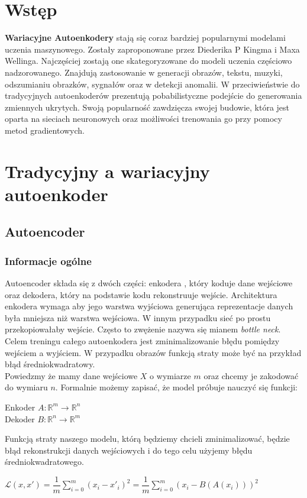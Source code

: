 \documentclass[a4paper,12pt]{book} %
\begin{document}
\sloppy



\thispagestyle{empty}




\thispagestyle{empty}

\tableofcontents{}

\chapter*{Wstęp} %
\textbf{Wariacyjne Autoenkodery} stają się coraz bardziej popularnymi modelami uczenia maszynowego. Zostały zaproponowane przez Diederika P Kingma i Maxa Wellinga. Najczęściej zostają one skategoryzowane do modeli uczenia częściowo nadzorowanego. Znajdują zastosowanie w generacji obrazów, tekstu, muzyki, odszumianiu obrazków, sygnałów oraz w detekcji anomalii. W przeciwieństwie do tradycyjnych autoenkoderów prezentują pobabilistyczne podejście do generowania zmiennych ukrytych. Swoją popularność zawdzięcza swojej budowie, która jest oparta na sieciach neuronowych oraz możliwości trenowania go przy pomocy metod gradientowych.
\chapter{Tradycyjny a wariacyjny autoenkoder} 
\section{Autoencoder}
\subsection{Informacje ogólne}
Autoencoder składa się z dwóch części: enkodera , który koduje dane wejściowe oraz dekodera, który na podstawie kodu rekonstruuje wejście. Architektura enkodera wymaga aby jego warstwa wyjściowa generująca reprezentacje danych była mniejsza niż warstwa wejściowa. W innym przypadku sieć po prostu przekopiowałaby wejście. Często to zwężenie nazywa się mianem \textit{bottle neck}. Celem treningu całego autoenkodera jest zminimalizowanie błędu pomiędzy wejściem a wyjściem. W przypadku obrazów funkcją straty może być na przykład błąd średniokwadratowy. \\
Powiedzmy że mamy dane wejściowe $X$ o wymiarze $m$ oraz chcemy je zakodować do wymiaru $n$. Formalnie możemy zapisać, że model próbuje nauczyć się funkcji: \\ 
\begin{center}
	Enkoder $A : \mathbb{R}^m \rightarrow \mathbb{R}^n$\\
	Dekoder $B: \mathbb{R}^n \rightarrow \mathbb{R}^m$
\end{center}
Funkcją straty naszego modelu, którą będziemy chcieli zminimalizować, będzie błąd rekonstrukcji danych wejściowych i do tego celu użyjemy błędu średniokwadratowego. 
\begin{center}
	$\mathcal{L}(x, x') = \dfrac{1}{m}\displaystyle\sum_{i=0}^{m}(x_i-x'_i)^2 = \dfrac{1}{m}\displaystyle\sum_{i=0}^{m}(x_i-B(A(x_i)))^2$
\end{center}
\end{document}

